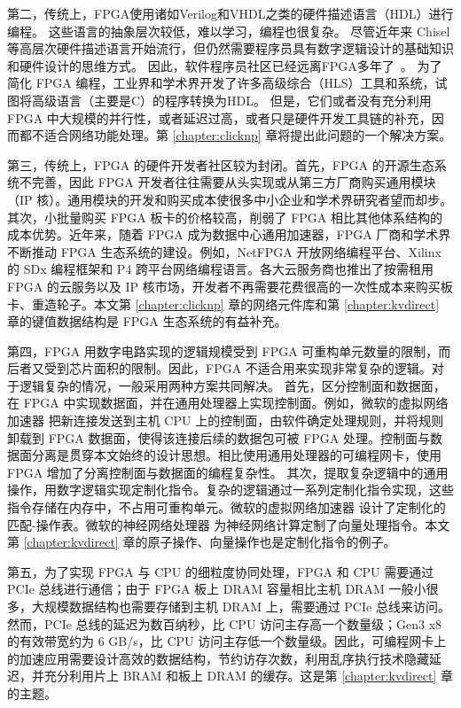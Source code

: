 第二，传统上，FPGA使用诸如Verilog和VHDL之类的硬件描述语言（HDL）进行编程。
这些语言的抽象层次较低，难以学习，编程也很复杂。
尽管近年来 Chisel \cite{bachrach2012chisel} 等高层次硬件描述语言开始流行，但仍然需要程序员具有数字逻辑设计的基础知识和硬件设计的思维方式。
因此，软件程序员社区已经远离FPGA多年了~\cite {bacon2013fpga}。
为了简化 FPGA 编程，工业界和学术界开发了许多高级综合（HLS）工具和系统，试图将高级语言（主要是C）的程序转换为HDL。
但是，它们或者没有充分利用 FPGA 中大规模的并行性，或者延迟过高，或者只是硬件开发工具链的补充，因而都不适合网络功能处理。第 \ref{chapter:clicknp} 章将提出此问题的一个解决方案。

第三，传统上，FPGA 的硬件开发者社区较为封闭。首先，FPGA 的开源生态系统不完善，因此 FPGA 开发者往往需要从头实现或从第三方厂商购买通用模块（IP 核）。通用模块的开发和购买成本使很多中小企业和学术界研究者望而却步。其次，小批量购买 FPGA 板卡的价格较高，削弱了 FPGA 相比其他体系结构的成本优势。近年来，随着 FPGA 成为数据中心通用加速器，FPGA 厂商和学术界不断推动 FPGA 生态系统的建设。例如，NetFPGA \cite{netfpga} 开放网络编程平台、Xilinx 的 SDx \cite{sdaccel} 编程框架和 P4 \cite{bosshart2014p4} 跨平台网络编程语言。各大云服务商也推出了按需租用 FPGA 的云服务以及 IP 核市场，开发者不再需要花费很高的一次性成本来购买板卡、重造轮子。本文第 \ref{chapter:clicknp} 章的网络元件库和第 \ref{chapter:kvdirect} 章的键值数据结构是 FPGA 生态系统的有益补充。

第四，FPGA 用数字电路实现的逻辑规模受到 FPGA 可重构单元数量的限制，而后者又受到芯片面积的限制。因此，FPGA 不适合用来实现非常复杂的逻辑。对于逻辑复杂的情况，一般采用两种方案共同解决。
首先，区分控制面和数据面，在 FPGA 中实现数据面，并在通用处理器上实现控制面。例如，微软的虚拟网络加速器 \cite{smartnic} 把新连接发送到主机 CPU 上的控制面，由软件确定处理规则，并将规则卸载到 FPGA 数据面，使得该连接后续的数据包可被 FPGA 处理。控制面与数据面分离是贯穿本文始终的设计思想。相比使用通用处理器的可编程网卡，使用 FPGA 增加了分离控制面与数据面的编程复杂性。
其次，提取复杂逻辑中的通用操作，用数字逻辑实现定制化指令。复杂的逻辑通过一系列定制化指令实现，这些指令存储在内存中，不占用可重构单元。微软的虚拟网络加速器 \cite{smartnic} 设计了定制化的匹配-操作表。微软的神经网络处理器 \cite{accelerating-deep-convolutional-neural-networks-using-specialized-hardware} 为神经网络计算定制了向量处理指令。本文第 \ref{chapter:kvdirect} 章的原子操作、向量操作也是定制化指令的例子。

第五，为了实现 FPGA 与 CPU 的细粒度协同处理，FPGA 和 CPU 需要通过 PCIe 总线进行通信；由于 FPGA 板上 DRAM 容量相比主机 DRAM 一般小很多，大规模数据结构也需要存储到主机 DRAM 上，需要通过 PCIe 总线来访问。然而，PCIe 总线的延迟为数百纳秒，比 CPU 访问主存高一个数量级；Gen3 x8 的有效带宽约为 6 GB/s，比 CPU 访问主存低一个数量级。因此，可编程网卡上的加速应用需要设计高效的数据结构，节约访存次数，利用乱序执行技术隐藏延迟，并充分利用片上 BRAM 和板上 DRAM 的缓存。这是第 \ref{chapter:kvdirect} 章的主题。

